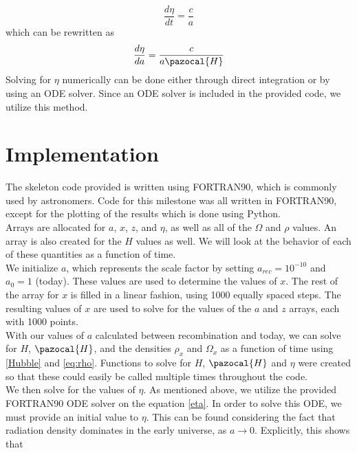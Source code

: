 \documentclass[a4paper]{article}
\begin{document}
\begin{equation*}
\dfrac{d\eta}{dt} = \dfrac{c}{a}
\end{equation*} 
which can be rewritten as
\begin{equation}\label{eta}
\dfrac{d\eta}{da} = \dfrac{c}{a \pazocal{H}}
\end{equation}
Solving for $\eta$ numerically can be done either through direct integration or by using an ODE solver. Since an ODE solver is included in the provided code, we utilize this method.

\clearpage


\section{Implementation}\label{sec:Imp}
The skeleton code provided is written using FORTRAN90, which is commonly used by astronomers. Code for this milestone was all written in FORTRAN90, except for the plotting of the results which is done using Python.\\

Arrays are allocated for $a$, $x$, $z$, and $\eta$, as well as all of the $\Omega$ and $\rho$ values. An array is also created for the $H$ values as well. We will look at the behavior of each of these quantities as a function of time.\\

We initialize $a$, which represents the scale factor by setting $a_{rec} = 10^{-10}$ and $a_0 = 1$ (today). These values are used to determine the values of $x$. The rest of the array for $x$ is filled in a linear fashion, using 1000 equally spaced steps. The resulting values of $x$ are used to solve for the values of the $a$ and $z$ arrays, each with 1000 points.\\

With our values of $a$ calculated between recombination and today, we can solve for $H$, $\pazocal{H}$, and the densities $\rho_x$ and $\Omega_x$ as a function of time using \ref{Hubble} and \ref{eq:rho}. Functions to solve for $H$, $\pazocal{H}$ and $\eta$ were created so that these could easily be called multiple times throughout the code.\\

We then solve for the values of $\eta$. As mentioned above, we utilize the provided FORTRAN90 ODE solver on the equation \ref{eta}. In order to solve this ODE, we must provide an initial value to $\eta$. This can be found considering the fact that radiation density dominates in the early universe, as $a \rightarrow 0$.
Explicitly, this shows that
\end{document}
